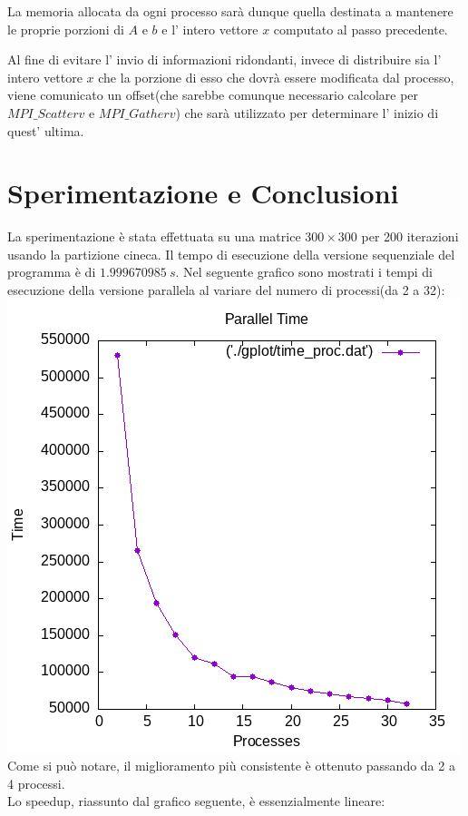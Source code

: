 \documentclass[twocolumn]{article}
\begin{document}
	La memoria allocata da ogni processo sarà dunque quella destinata a mantenere le proprie porzioni di $A$ e  $b$ e l' intero vettore $x$ computato al passo precedente.
	
	Al fine di evitare l' invio di informazioni ridondanti, invece di distribuire sia l' intero vettore $x$ che la porzione di esso che dovrà essere modificata dal processo, viene comunicato un offset(che sarebbe comunque necessario calcolare per $MPI\_Scatterv$ e $MPI\_Gatherv$) che sarà utilizzato per determinare l' inizio di quest' ultima.
	
	\section{Sperimentazione e Conclusioni}
	La sperimentazione è stata effettuata su una matrice $300\times300$ per 200 iterazioni usando la partizione cineca. Il tempo di esecuzione della versione sequenziale del programma è di $1.999670985\ s$.
	Nel seguente grafico sono mostrati i tempi di esecuzione della versione parallela al variare del numero di processi(da 2 a 32):\\
	\includegraphics[scale=0.5]{time_proc.png}
	\\
	Come si può notare, il miglioramento più consistente è ottenuto passando da 2 a 4 processi.
	\\Lo speedup, riassunto dal grafico seguente, è essenzialmente lineare:\\
\end{document}
